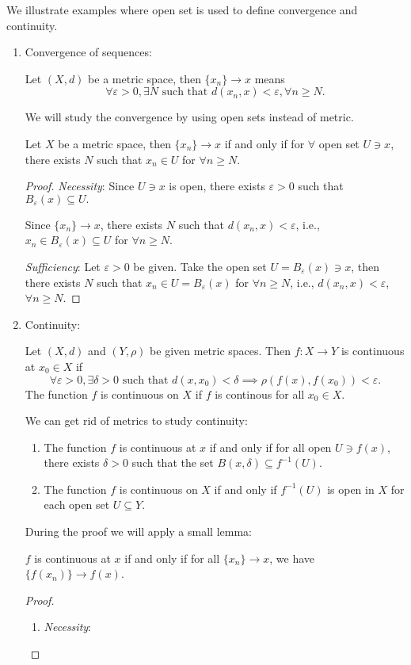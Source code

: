 We illustrate examples where open set is used to define convergence and continuity.
\begin{enumerate}
\item
Convergence of sequences:
\begin{definition}[Convergence]
Let $(X,d)$ be a metric space, then $\{x_n\}\to x$ means
\[
\forall\varepsilon>0,\exists N\mbox{ such that }d(x_n,x)<\varepsilon,\forall n\ge N.
\]
\end{definition}
We will study the convergence by using open sets instead of metric.
\begin{proposition}
Let $X$ be a metric space, then $\{x_n\}\to x$ if and only if for $\forall$ open set $U\ni x$, there exists $N$ such that $x_n\in U$ for $\forall n\ge N$.
\end{proposition}
\begin{proof}
\textit{Necessity}:
Since $U\ni x$ is open, there exists $\varepsilon>0$ such that $B_\varepsilon(x)\subseteq U.$

Since $\{x_n\}\to x$, there exists $N$ such that $d(x_n,x)<\varepsilon$, i.e., $x_n\in B_\varepsilon(x)\subseteq U$ for $\forall n\ge N$.

\textit{Sufficiency}:
Let $\varepsilon>0$ be given. Take the open set $U=B_\varepsilon(x)\ni x$, then there exists $N$ such that $x_n\in U=B_\varepsilon(x)$ for $\forall n\ge N$, i.e., $d(x_n,x)<\varepsilon$, $\forall n\ge N$.

\end{proof}

\item
Continuity:
\begin{definition}[Continuity]
Let $(X,d)$ and $(Y,\rho)$ be given metric spaces. Then $f:X\to Y$ is continuous at $x_0\in X$ if 
\[
\forall\varepsilon>0,\exists\delta>0\mbox{ such that }
d(x,x_0)<\delta\implies
\rho(f(x),f(x_0))<\varepsilon.
\]
The function $f$ is continuous on $X$ if $f$ is continous for all $x_0\in X$.
\end{definition}
We can get rid of metrics to study continuity:
\begin{proposition}
\begin{enumerate}
\item
The function  $f$ is continuous at $x$ if and only if for all open $U\ni f(x)$, there exists $\delta>0$ such that the set $B(x,\delta)\subseteq f^{-1}(U)$.
\item
The function $f$ is continuous on $X$ if and only if $f^{-1}(U)$ is open in $X$ for each open set $U\subseteq Y$.
\end{enumerate}
\end{proposition}
During the proof we will apply a small lemma:
\begin{proposition}\label{Pro:1:15}
$f$ is continuous at $x$ if and only if for all $\{x_n\}\to x$, we have $\{f(x_n)\}\to f(x)$.
\end{proposition}
\begin{proof}
\begin{enumerate}
\item
\textit{Necessity}:


\end{enumerate}
\end{proof}
\end{enumerate}
